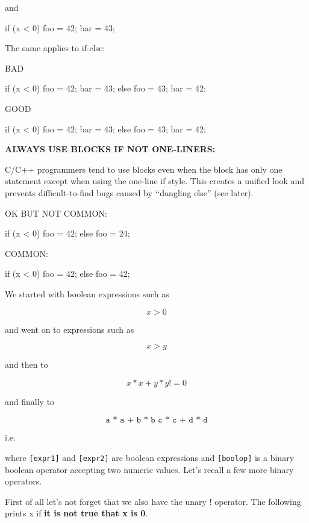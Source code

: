 and
\begin{console}
if (x < 0)
{
    foo = 42;
    bar = 43;
} 
\end{console}

The same applies to if-else:

BAD
\begin{console}
if (x < 0) {
    foo = 42;
    bar = 43;
}
else {
    foo = 43;
    bar = 42;
}
\end{console}
GOOD
\begin{console}
if (x < 0)
{  
    foo = 42;
    bar = 43;
}
else
{       
    foo = 43;
    bar = 42;
}
\end{console}

\textbf{ALWAYS USE BLOCKS IF NOT ONE-LINERS:}

C/C++ programmers tend to use blocks even when the block has only one
statement except when using the one-line if style. This creates a
unified look and prevents difficult-to-find bugs caused by \lq\lq dangling
else'' (see later).

OK BUT NOT COMMON:
\begin{console}
if (x < 0)
   foo = 42;
else
   foo = 24; 
\end{console}

COMMON:
\begin{console}
if (x < 0)
{
    foo = 42;
}
else
{
    foo = 42;
}
\end{console}
\newpage{}

We started with boolean expressions such as

\[x > 0\]

and went on to expressions such as

\[x > y\]

and then to

\[x * x + y * y != 0\]

and finally to

\[\texttt{a * a + b * b  c * c + d * d}\]

i.e.
\begin{center}
\EMPHASIZE{\texttt{[expr1] [boolop] [expr2]}}
\end{center}
where \texttt{[expr1]} and \texttt{[expr2]} are boolean expressions
and \texttt{[boolop]} is a binary boolean operator accepting two
numeric values. Let's recall a few more binary operators.

First of all let's not forget that we also have the unary ! operator. The following prints x if \textbf{it is not true that x is 0}.

